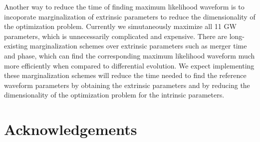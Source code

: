 \documentclass[twocolumn]{aastex631}
\begin{document}
Another way to reduce the time of finding maximum likelihood waveform is to
incoporate marginalization of extrinsic parameters to reduce the dimensionality
of the optimization problem. Currently we simutaneously maximize all 11 GW
parameters, which is unnecessarily complicated and expensive. There are
long-existing marginalization schemes over extrinsic parameters such as merger
time and phase, which can find the corresponding maximum likelihood waveform
much more efficiently when compared to differential evolution. We expect
implementing these marginalization schemes will reduce the time needed to find
the reference waveform parameters by obtaining the extrinsic parameters and by
reducing the dimensionality of the optimization problem for the intrinsic
parameters.




\section{Acknowledgements}


\end{document}
